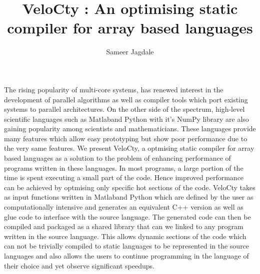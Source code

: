 \documentclass[a4paper, 12pt]{article}
\newcommand{\matlab}{{\textsc Matlab}\space}
\begin{document}
\title{VeloCty : An optimising static compiler for array based languages}
\author{Sameer Jagdale}
\maketitle
The rising popularity of multi-core systems, has renewed interest in the development of parallel algorithms as well as compiler tools which port existing systems to parallel architectures. On the other side of the spectrum, high-level scientific languages such as \matlab and Python with it's NumPy library are also gaining popularity among scientists and mathematicians. These languages provide many features which allow easy prototyping but show poor performance due to the very same features. We present VeloCty, a optmising static compiler for array based languages as a solution to the problem of enhancing performance of programs written in these languages. In most programs, a large portion of the time is spent executing a small part of the code. Hence improved performance can be  achieved by optmising only specific hot sections of the code. VeloCty takes as input functions written in \matlab and Python which are defined by the user as computationally intensive and generates an equivalent C++ version as well as glue code to interface with the source language. The generated code can then be compiled and packaged as a shared library that can we linked to any program written in the source language. This allows dynamic sections of the code which can not be trivially compiled to static languages to be represented in the source languages and also allows the users to continue programming in the language of their choice and yet observe significant speedups. 
\end{document}
